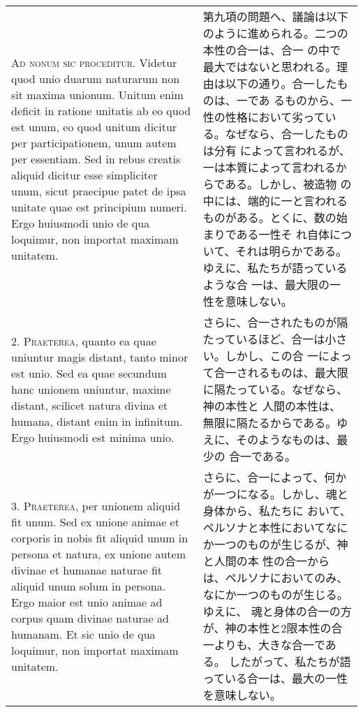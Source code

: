 \documentclass[10pt]{jsarticle} %
\begin{document}
\begin{longtable}{p{21em}p{21em}}



{\Huge A}{\scshape d nonum sic proceditur}. Videtur quod unio duarum
naturarum non sit maxima unionum. Unitum enim deficit in ratione
unitatis ab eo quod est unum, eo quod unitum dicitur per
participationem, unum autem per essentiam. Sed in rebus creatis
aliquid dicitur esse simpliciter unum, sicut praecipue patet de ipsa
unitate quae est principium numeri. Ergo huiusmodi unio de qua
loquimur, non importat maximam unitatem.


&

第九項の問題へ、議論は以下のように進められる。二つの本性の合一は、合一
の中で最大ではないと思われる。理由は以下の通り。合一したものは、一であ
るものから、一性の性格において劣っている。なぜなら、合一したものは分有
によって言われるが、一は本質によって言われるからである。しかし、被造物
の中には、端的に一と言われるものがある。とくに、数の始まりである一性そ
れ自体について、それは明らかである。ゆえに、私たちが語っているような合
一は、最大限の一性を意味しない。

\\



2. {\scshape Praeterea}, quanto ea quae uniuntur magis distant, tanto
minor est unio. Sed ea quae secundum hanc unionem uniuntur, maxime
distant, scilicet natura divina et humana, distant enim in
infinitum. Ergo huiusmodi est minima unio.


&

さらに、合一されたものが隔たっているほど、合一は小さい。しかし、この合
一によって合一されるものは、最大限に隔たっている。なぜなら、神の本性と
人間の本性は、無限に隔たるからである。ゆえに、そのようなものは、最少の
合一である。


\\



3. {\scshape Praeterea}, per unionem aliquid fit unum. Sed ex unione
animae et corporis in nobis fit aliquid unum in persona et natura, ex
unione autem divinae et humanae naturae fit aliquid unum solum in
persona. Ergo maior est unio animae ad corpus quam divinae naturae ad
humanam. Et sic unio de qua loquimur, non importat maximam unitatem.


&

さらに、合一によって、何かが一つになる。しかし、魂と身体から、私たちに
おいて、ペルソナと本性においてなにか一つのものが生じるが、神と人間の本
性の合一からは、ペルソナにおいてのみ、なにか一つのものが生じる。ゆえに、
魂と身体の合一の方が、神の本性と2限本性の合一よりも、大きな合一である。
したがって、私たちが語っている合一は、最大の一性を意味しない。



\end{longtable}
\end{document}

